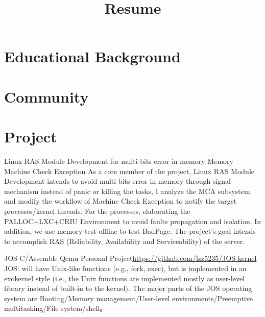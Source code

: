 \documentclass[11pt,a4paper]{moderncv}
\title{Resume}                      %
\begin{document}
\maketitle

\section{Educational Background}


\section{Community}

\section{Project}
\renewcommand{\baselinestretch}{1.2}

{Linux RAS Module Development for multi-bits error in memory}
{Memory Machine Check Exception}
{}{}
{As a core member of the project, Linux RAS Module Development intends to avoid multi-bits error in memory through signal mechanism instead of panic or killing the tasks, I analyze the MCA subsystem and modify the workflow of Machine Check Exception to notify the target processes/kernel threads. For the processes, elaborating the PALLOC+LXC+CRIU Environment to avoid faults propagation and isolation. In addition, we use memory test offline to test BadPage. The project’s goal intends to accomplish RAS (Reliability, Availability and Serviceability) of the server.}

{JOS}
{C/Assemble Qemu}
{Personal Projcet}{\url{https://github.com/lzz5235/JOS-kernel}}
{JOS: will have Unix-like functions (e.g., fork, exec), but is implemented in an exokernel style (i.e., the Unix functions are implemented mostly as user-level library instead of built-in to the kernel). The major parts of the JOS operating system are Booting/Memory management/User-level environments/Preemptive multitasking/File system/shell。}
\end{document}
